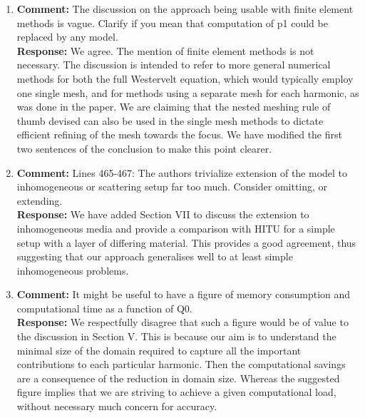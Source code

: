 \documentclass[11pt]{article}
\begin{document}
\begin{enumerate}
	\item \textbf{Comment:} The discussion on the approach being usable with finite element methods is vague. Clarify if you mean that computation of p1 could be replaced by any model. \\
	\textbf{Response:} We agree. The mention of finite element methods is not necessary. The discussion is intended to 
	refer to more general numerical methods for both the full Westervelt equation, which 
	would typically employ one single mesh, and for methods using a separate mesh for each 
	harmonic, as was done in the paper. We are claiming that the nested meshing rule of thumb 
	devised can also be used in the single mesh methods to dictate efficient refining of the mesh towards the focus.
	We have modified the first two sentences of the conclusion to make this point clearer.
	
	\item \textbf{Comment:} Lines 465-467: The authors trivialize extension of the model to inhomogeneous or scattering setup far too much. Consider omitting, or extending. \\
	\textbf{Response:} We have added Section VII to discuss the extension to inhomogeneous
	media and provide a comparison with HITU for a simple setup with a layer of differing material. This 
	provides a good agreement, thus suggesting that our approach generalises well to at least 
	simple inhomogeneous problems.

	\item \textbf{Comment:} It might be useful to have a figure of memory consumption and computational time as a function of Q0. \\
	\textbf{Response:} We respectfully disagree that such a figure would be of value to the discussion in Section V. This is 
	because our aim is to understand the minimal size of the domain required to capture all the important 
	contributions to each particular harmonic. Then the computational savings are a consequence of the 
	reduction in domain size. Whereas the suggested figure implies that we are striving to achieve a given 
	computational load, without necessary much concern for accuracy.
\end{enumerate}
\end{document}
